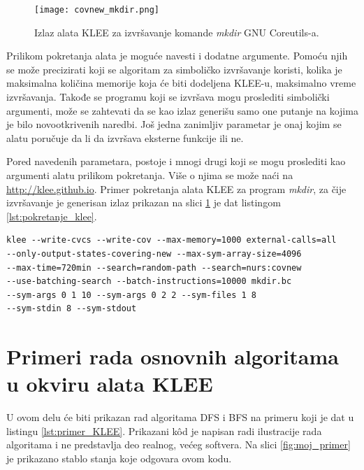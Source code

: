 \documentclass[12pt,oneside]{memoir}
\begin{document}
\begin{figure}[ht]
    \centering
    \texttt{[image: covnew\_mkdir.png]}
    \caption{Izlaz alata KLEE za izvršavanje komande \textit{mkdir} GNU Coreutils-a.}
    \label{fig:covnew_mkdir}
\end{figure}

Prilikom pokretanja alata je moguće navesti i dodatne argumente. Pomoću njih se može precizirati koji se algoritam za simboličko izvršavanje koristi, kolika je maksimalna količina memorije koja će biti dodeljena KLEE-u, maksimalno vreme izvršavanja. Takođe se programu koji se izvršava mogu proslediti simbolički argumenti, može se zahtevati da se kao izlaz generišu samo one putanje na kojima je bilo novootkrivenih naredbi. Još jedna zanimljiv parametar je onaj kojim se alatu poručuje da li da izvršava eksterne funkcije ili ne. 

Pored navedenih parametara, postoje i mnogi drugi koji se mogu proslediti kao argumenti alatu prilikom pokretanja. Više o njima se može naći na \url{http://klee.github.io}. Primer pokretanja alata KLEE za program \textit{mkdir}, za čije izvršavanje je generisan izlaz prikazan na slici \ref{fig:covnew_mkdir} je dat listingom \ref{lst:pokretanje_klee}.

\begin{lstlisting}[caption={Primer pokretanja alata KLEE.}, label={lst:pokretanje_klee}, captionpos=b]
klee --write-cvcs --write-cov --max-memory=1000 external-calls=all
--only-output-states-covering-new --max-sym-array-size=4096 
--max-time=720min --search=random-path --search=nurs:covnew 
--use-batching-search --batch-instructions=10000 mkdir.bc 
--sym-args 0 1 10 --sym-args 0 2 2 --sym-files 1 8 
--sym-stdin 8 --sym-stdout
\end{lstlisting}

\section{Primeri rada osnovnih algoritama u okviru alata KLEE} \label{osnovni_algoritmi}
U ovom delu će biti prikazan rad algoritama DFS i BFS na primeru koji je dat u listingu \ref{lst:primer_KLEE}. Prikazani k\^od je napisan radi ilustracije rada algoritama i ne predstavlja deo realnog, većeg softvera. Na slici \ref{fig:moj_primer} je prikazano stablo stanja koje odgovara ovom kodu. 
\end{document}
